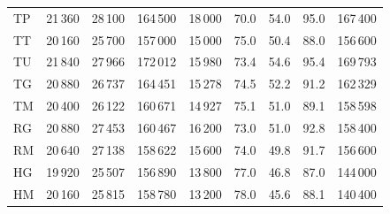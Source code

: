 \begin{minipage}{\textwidth}
\begin{tabular*}{\textwidth}{@{\extracolsep{\fill}}lrrrrrrrr@{}}
TP & 21\,360 & 28\,100 & 164\,500 & 18\,000 & 70.0 & 54.0 & 95.0 & 167\,400\\
TT & 20\,160 & 25\,700 & 157\,000 & 15\,000 & 75.0 & 50.4 & 88.0 & 156\,600\\
TU & 21\,840 & 27\,966 & 172\,012 & 15\,980 & 73.4 & 54.6 & 95.4 & 169\,793\\
TG & 20\,880 & 26\,737 & 164\,451 & 15\,278 & 74.5 & 52.2 & 91.2 & 162\,329\\
TM & 20\,400 & 26\,122 & 160\,671 & 14\,927 & 75.1 & 51.0 & 89.1 & 158\,598\\
RG & 20\,880 & 27\,453 & 160\,467 & 16\,200 & 73.0 & 51.0 & 92.8 & 158\,400\\
RM & 20\,640 & 27\,138 & 158\,622 & 15\,600 & 74.0 & 49.8 & 91.7 & 156\,600\\
HG & 19\,920 & 25\,507 & 156\,890 & 13\,800 & 77.0 & 46.8 & 87.0 & 144\,000\\
HM & 20\,160 & 25\,815 & 158\,780 & 13\,200 & 78.0 & 45.6 & 88.1 & 140\,400\\
\bottomrule\end{tabular*}
\end{minipage}\par\medskip
